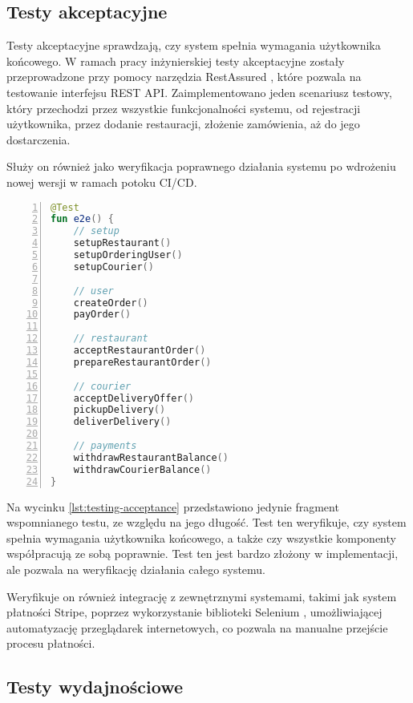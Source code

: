 \subsection{Testy akceptacyjne}

Testy akceptacyjne sprawdzają, czy system spełnia wymagania użytkownika końcowego. W ramach pracy inżynierskiej testy akceptacyjne zostały przeprowadzone przy pomocy narzędzia RestAssured \cite{restassured}, które pozwala na testowanie interfejsu REST API. Zaimplementowano jeden scenariusz testowy, który przechodzi przez wszystkie funkcjonalności systemu, od rejestracji użytkownika, przez dodanie restauracji, złożenie zamówienia, aż do jego dostarczenia.

Służy on również jako weryfikacja poprawnego działania systemu po wdrożeniu nowej wersji w ramach potoku CI/CD.

\begin{lstlisting}[caption={Scenariusz testowy w ramach testów akceptacyjnych},label={lst:testing-acceptance},captionpos=b,language=Kotlin,numbers=left]
@Test
fun e2e() {
    // setup
    setupRestaurant()
    setupOrderingUser()
    setupCourier()

    // user
    createOrder()
    payOrder()

    // restaurant
    acceptRestaurantOrder()
    prepareRestaurantOrder()

    // courier
    acceptDeliveryOffer()
    pickupDelivery()
    deliverDelivery()

    // payments
    withdrawRestaurantBalance()
    withdrawCourierBalance()
}
\end{lstlisting}

Na wycinku \ref{lst:testing-acceptance} przedstawiono jedynie fragment wspomnianego testu, ze względu na jego długość. Test ten weryfikuje, czy system spełnia wymagania użytkownika końcowego, a także czy wszystkie komponenty współpracują ze sobą poprawnie. Test ten jest bardzo złożony w implementacji, ale pozwala na weryfikację działania całego systemu.

Weryfikuje on również integrację z zewnętrznymi systemami, takimi jak system płatności Stripe, poprzez wykorzystanie biblioteki Selenium \cite{selenium}, umożliwiającej automatyzację przeglądarek internetowych, co pozwala na manualne przejście procesu płatności.

\subsection{Testy wydajnościowe}

